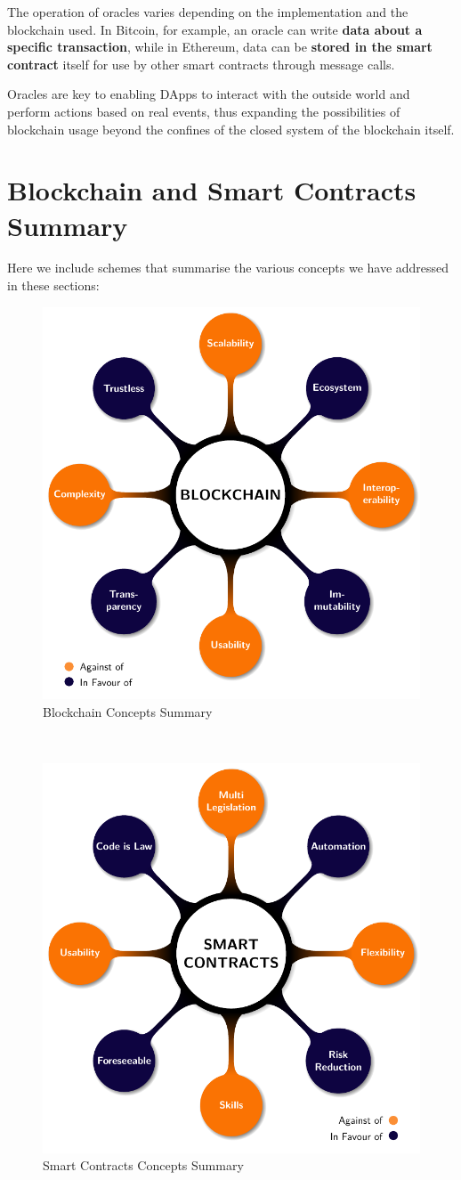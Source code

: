 The operation of oracles varies depending on the implementation and the blockchain used. In Bitcoin, for example, an oracle can write \textbf{data about a specific transaction}, while in Ethereum, data can be \textbf{stored in the smart contract} itself for use by other smart contracts through message calls.

Oracles are key to enabling DApps to interact with the outside world and perform actions based on real events, thus expanding the possibilities of blockchain usage beyond the confines of the closed system of the blockchain itself.

\section{Blockchain and Smart Contracts Summary}
Here we include schemes that summarise the various concepts we have addressed in these sections:
\begin{figure}[!htbp]
\centering
\includegraphics[width=0.7\linewidth]{tikz/chapter4 - Blockchain Summary.pdf}
\caption{Blockchain Concepts Summary}
\end{figure}

\

\begin{figure}[!htbp]
\centering
\includegraphics[width=0.7\linewidth]{tikz/chapter4 - Smart Contracts Summary.pdf}
\caption{Smart Contracts Concepts Summary}
\end{figure}